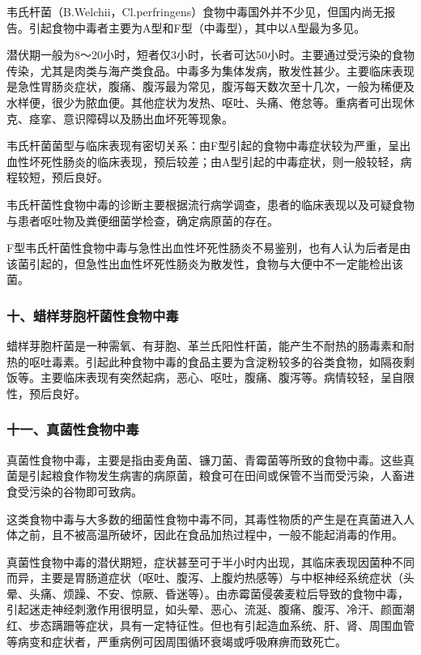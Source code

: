 韦氏杆菌（B.Welchii，Cl.perfringens）食物中毒国外并不少见，但国内尚无报告。引起食物中毒者主要为A型和F型（中毒型），其中以A型最为多见。

潜伏期一般为8～20小时，短者仅3小时，长者可达50小时。主要通过受污染的食物传染，尤其是肉类与海产类食品。中毒多为集体发病，散发性甚少。主要临床表现是急性胃肠炎症状，腹痛、腹泻最为常见，腹泻每天数次至十几次，一般为稀便及水样便，很少为脓血便。其他症状为发热、呕吐、头痛、倦怠等。重病者可出现休克、痉挛、意识障碍以及肠出血坏死等现象。

韦氏杆菌菌型与临床表现有密切关系：由F型引起的食物中毒症状较为严重，呈出血性坏死性肠炎的临床表现，预后较差；由A型引起的中毒症状，则一般较轻，病程较短，预后良好。

韦氏杆菌性食物中毒的诊断主要根据流行病学调查，患者的临床表现以及可疑食物与患者呕吐物及粪便细菌学检查，确定病原菌的存在。

F型韦氏杆菌性食物中毒与急性出血性坏死性肠炎不易鉴别，也有人认为后者是由该菌引起的，但急性出血性坏死性肠炎为散发性，食物与大便中不一定能检出该菌。

\subsubsection{十、蜡样芽胞杆菌性食物中毒}

蜡样芽胞杆菌是一种需氧、有芽胞、革兰氏阳性杆菌，能产生不耐热的肠毒素和耐热的呕吐毒素。引起此种食物中毒的食品主要为含淀粉较多的谷类食物，如隔夜剩饭等。主要临床表现有突然起病，恶心、呕吐，腹痛、腹泻等。病情较轻，呈自限性，预后良好。

\subsubsection{十一、真菌性食物中毒}

真菌性食物中毒，主要是指由麦角菌、镰刀菌、青霉菌等所致的食物中毒。这些真菌是引起粮食作物发生病害的病原菌，粮食可在田间或保管不当而受污染，人畜进食受污染的谷物即可致病。

这类食物中毒与大多数的细菌性食物中毒不同，其毒性物质的产生是在真菌进入人体之前，且不被高温所破坏，因此在食品加热过程中，一般不能起消毒的作用。

真菌性食物中毒的潜伏期短，症状甚至可于半小时内出现，其临床表现因菌种不同而异，主要是胃肠道症状（呕吐、腹泻、上腹灼热感等）与中枢神经系统症状（头晕、头痛、烦躁、不安、惊厥、昏迷等）。由赤霉菌侵袭麦粒后导致的食物中毒，引起迷走神经刺激作用很明显，如头晕、恶心、流涎、腹痛、腹泻、冷汗、颜面潮红、步态蹒跚等症状，具有一定特征性。但也有引起造血系统、肝、肾、周围血管等病变和症状者，严重病例可因周围循环衰竭或呼吸麻痹而致死亡。

